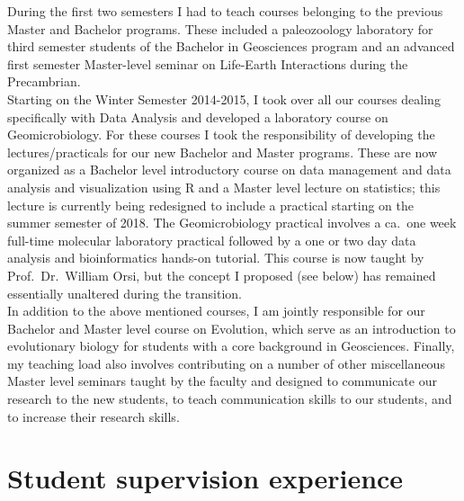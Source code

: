 \documentclass[a4paper,11pt]{article}
\begin{document}
During the first two semesters I had to teach courses belonging to the previous Master and Bachelor programs. These included a paleozoology laboratory for third semester students of the Bachelor in Geosciences program and an advanced first semester Master-level seminar on Life-Earth Interactions during the Precambrian.\\

Starting on the Winter Semester 2014-2015, I took over all our courses dealing specifically with Data Analysis and developed a laboratory course on Geomicrobiology. For these courses I took the responsibility of developing the lectures/practicals for our new Bachelor and Master programs. These are now organized as a Bachelor level introductory course on data management and data analysis and visualization using R and a Master level lecture on statistics; this lecture is currently being redesigned to include a practical starting on the summer semester of 2018. The Geomicrobiology practical involves a ca.~one week full-time molecular laboratory practical followed by a one or two day data analysis and bioinformatics hands-on tutorial. This course is now taught by Prof.~Dr.~William Orsi, but the concept I proposed (see below) has remained essentially unaltered during the transition.\\

In addition to the above mentioned courses, I am jointly responsible for our Bachelor and Master level course on Evolution, which serve as an introduction to evolutionary biology for students with a core background in Geosciences. Finally, my teaching load also involves contributing on a number of other miscellaneous Master level seminars taught by the faculty and designed to communicate our research to the new students, to teach communication skills to our students, and to increase their research skills.

\section*{Student supervision experience}
\end{document}
